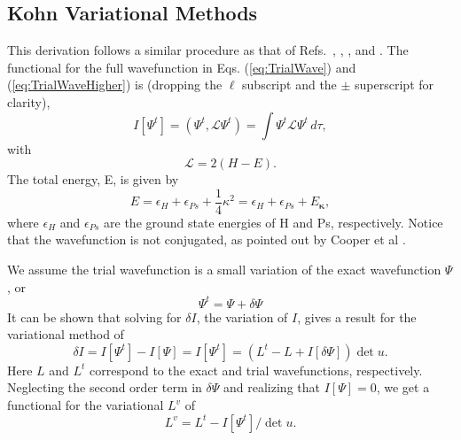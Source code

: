 \documentclass[preprint,showpacs,preprintnumbers,amsmath,amssymb,longbibliography,pra,aps]{revtex4-1}
\newcommand{\beq}{\begin{equation}}
\newcommand{\eeq}{\end{equation}}
\begin{document}
\subsection{Kohn Variational Methods}
\label{sec:Kohn}
This derivation follows a similar procedure as that of Refs.~\cite{Lucchese1989}, \cite{Cooper2010}, \cite{Armour1991}, and \cite{VanReethThesis}.
The functional for the full wavefunction in Eqs. (\ref{eq:TrialWave}) and (\ref{eq:TrialWaveHigher}) is (dropping the $\ell$ subscript and the $\pm$ superscript for clarity),
\begin{equation}
I[\Psi^t] = \left(\Psi^t, \mathcal{L} \Psi^t \right) = \int \Psi^t \mathcal{L} \Psi^t \,d\tau,
\label{eq:IlDefPsi}
\end{equation}
with
\beq
\mathcal{L} = 2(H - E).
\label{eq:LDef}
\eeq
The total energy, E, is given by
\begin{equation}
\label{eq:TotalEnergy}
E = \epsilon_H + \epsilon_{Ps} + \frac{1}{4}\kappa^2 = \epsilon_H + \epsilon_{Ps} + E_{\bm \kappa},
\end{equation}
where $\epsilon_H$ and $\epsilon_{Ps}$ are the ground state energies of H and Ps, respectively. Notice that the wavefunction is not conjugated, as pointed out by Cooper et al \cite{Cooper2010}.

We assume the trial wavefunction is a small variation of the exact wavefunction $\Psi$, or
\beq
\Psi^t = \Psi + \delta \Psi
\label{eq:PsiTrialRelation}
\eeq
It can be shown that solving for $\delta I$, the variation of $I$, gives a result for the variational method of
\beq
\delta I = I[\Psi^t] - I[\Psi] = I[\Psi^t] = (L^t - L + I[\delta \Psi]) \det u.
\label{eq:IlPsiVariation}
\eeq
Here $L$ and $L^t$ correspond to the exact and trial wavefunctions, respectively. Neglecting the second order term in $\delta \Psi$ and realizing that $I[\Psi] = 0$, we get a functional for the variational $L^v$ of
\beq
L^v = L^t - I[\Psi^t] / \det u.
\label{eq:ComplexKohnVariation}
\eeq
\end{document}
